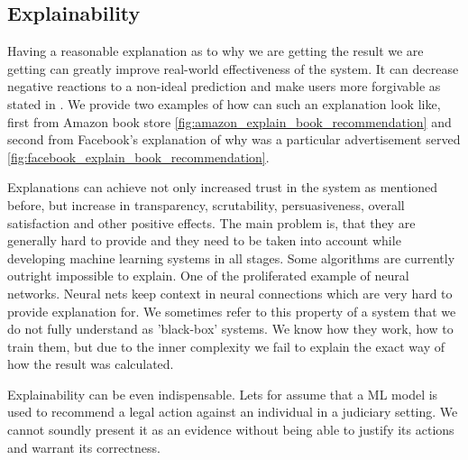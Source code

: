 \subsection{Explainability}
Having a reasonable explanation as to why we are getting the result we are getting can greatly improve real-world effectiveness of the system. It can decrease negative reactions to a non-ideal prediction and make users more forgivable as stated in \cite{tintarev2007survey}. We provide two examples of how can such an explanation look like, first from Amazon book store \ref{fig:amazon_explain_book_recommendation} and second from Facebook's explanation of why was a particular advertisement served \ref{fig:facebook_explain_book_recommendation}.

Explanations can achieve not only increased trust in the system as mentioned before, but increase in transparency, scrutability, persuasiveness, overall satisfaction and other positive effects. The main problem is, that they are generally hard to provide and they need to be taken into account while developing machine learning systems in all stages. Some algorithms are currently outright impossible to explain. One of the proliferated example of neural networks. Neural nets keep context in neural connections which are very hard to provide explanation for. We sometimes refer to this property of a system that we do not fully understand as 'black-box' systems. We know how they work, how to train them, but due to the inner complexity we fail to explain the exact way of how the result was calculated.

Explainability can be even indispensable. Lets for assume that a ML model is used to recommend a legal action against an individual in a judiciary setting. We cannot soundly present it as an evidence without being able to justify its actions and warrant its correctness.


